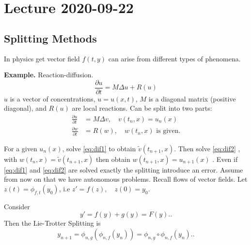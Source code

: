 \documentclass{article}
\theoremstyle{remark}
\newcommand{\newpara}
  {
  \vskip 0.4cm
  }
\begin{document}
\newpage
\section{Lecture 2020-09-22}%
\label{sec:lecture_2020_09_22}


\subsection{Splitting Methods}%
\label{sub:splitting_methods}


In physics get vector field $f\left( t,y \right)$ can arise from different types of phenomena.

\newpara
\textbf{Example.} Reaction-diffusion. \[
  \frac{\partial u}{\partial t} = M \Delta  u + R\left( u \right)
\] 
$u$ is a vector of concentrations, $u = u\left( x,t \right)$, $M$ is a diagonal matrix (positive diagonal), and $R\left( u \right)$ are local reactions. Can be split into two parts: 
\begin{align}
  \label{eq:dif1}
\frac{\partial u}{\partial t}   & = M \Delta v, \quad v\left( t_{n}, x \right) = u_{n}\left( x \right)  \\
  \label{eq:dif2}
\frac{\partial w}{\partial t}  &=  R \left( w \right), \quad w\left( t_{n},x \right) \text{ is given}  
.\end{align}

For a given $u_{n}\left( x \right)$, solve \eqref{eq:dif1}  to obtain $\widetilde{v}\left( t_{n+1}, x \right)$. Then solve \eqref{eq:dif2} , with $w\left( t_{n} , x \right) = \widetilde{v}\left( t_{n+1}, x \right)$ then obtain $w\left( t_{n+1},x \right) = u_{n+1}\left( x \right)$ . Even if  \eqref{eq:dif1} and \eqref{eq:dif2} are solved exactly the splitting introduce an error. Assume from now on that we have autonomous problems. Recall flows of vector fields. Let $z\left(
t\right) = \phi_{f,t} \left( y_{0}  \right)$, i.e $z'  = f\left( z \right), \quad  z\left( 0 \right)= y_{0} $. 

\newpara
Consider   
\begin{equation}
\label{eq:bigF}
y' = f\left( y \right) + g\left( y \right) = F\left( y \right).
.\end{equation}
 Then the Lie-Trotter Splitting is
 \begin{equation}
 \label{eq:phi1}
y_{n+1} = \phi _{n,g} \left( \phi _{n,f} \left( y_{n} \right) \right) = \phi _{n,g} \circ \phi _{n,f} \left( y_{n} \right).
 .\end{equation}
\end{document}
